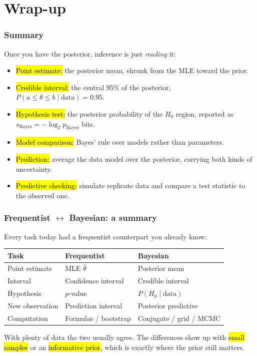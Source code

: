 \documentclass[slidestop,compress,mathserif]{beamer}
\begin{document}
\section{Wrap-up}

\begin{frame}
\frametitle{Summary}

Once you have the posterior, inference is just \emph{reading} it:
{\small
\begin{itemize}
    \item \hl{Point estimate:} the posterior mean, shrunk from the MLE toward the prior.
    \pause
    \item \hl{Credible interval:} the central $95\%$ of the posterior, $P(a \le \theta \le b \mid \text{data}) = 0.95$.
    \pause
    \item \hl{Hypothesis test:} the posterior probability of the $H_0$ region, reported as $s_{\text{Bayes}} = -\log_2 p_{\text{Bayes}}$ bits.
    \pause
    \item \hl{Model comparison:} Bayes' rule over models rather than parameters.
    \pause
    \item \hl{Prediction:} average the data model over the posterior, carrying both kinds of uncertainty.
    \pause
    \item \hl{Predictive checking:} simulate replicate data and compare a test statistic to the observed one.
\end{itemize}}
\end{frame}

\begin{frame}
\frametitle{Frequentist $\longleftrightarrow$ Bayesian: a summary}

Every task today had a frequentist counterpart you already know:

{\footnotesize
\renewcommand{\arraystretch}{1.25}
\begin{center}
\begin{tabular}{p{2.2cm} p{2.9cm} p{3.4cm}}
\toprule
\textbf{Task} & \textbf{Frequentist} & \textbf{Bayesian} \\
\midrule
Point estimate & MLE $\hat\theta$ & Posterior mean \\
Interval & Confidence interval & Credible interval \\
Hypothesis & $p$-value & $P(H_0 \mid \text{data})$ \\
New observation & Prediction interval & Posterior predictive \\
Computation & Formulas / bootstrap & Conjugate / grid / MCMC \\
\bottomrule
\end{tabular}
\end{center}
}

\pause

With plenty of data the two usually agree. The differences show up with \hl{small samples} or an \hl{informative prior}, which is exactly where the prior still matters.
\end{frame}
\end{document}
